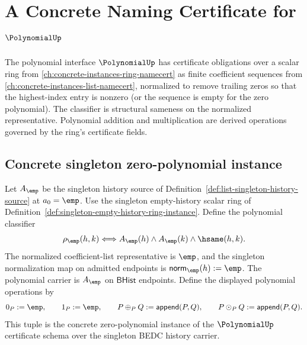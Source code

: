 \chapter{A Concrete Naming Certificate for \(\PolynomialUp\)}
\label{ch:concrete-instances-polynomial-namecert}

The polynomial interface \(\PolynomialUp\) has certificate obligations over a scalar ring from \autoref{ch:concrete-instances-ring-namecert} as finite coefficient sequences from \autoref{ch:concrete-instances-list-namecert}, normalized to remove trailing zeros so that the highest-index entry is nonzero (or the sequence is empty for the zero polynomial). The classifier is structural sameness on the normalized representative. Polynomial addition and multiplication are derived operations governed by the ring's certificate fields.

\section{Concrete singleton zero-polynomial instance}
\label{sec:polynomial-concrete-singleton-zero-instance}

\begin{definition}
\label{def:singleton-zero-polynomial-instance}
Let $A_{\emp}$ be the singleton history source of
Definition~\ref{def:list-singleton-history-source} at $a_0=\emp$. Use the
singleton empty-history scalar ring of
Definition~\ref{def:singleton-empty-history-ring-instance}. Define the
polynomial classifier
$$
\rho_{\emp}(h,k)\Longleftrightarrow
A_{\emp}(h)\land A_{\emp}(k)\land\hsame(h,k).
$$
The normalized coefficient-list representative is $\emp$, and the singleton
normalization map on admitted endpoints is $\mathsf{norm}_{\emp}(h):=\emp$.
The polynomial carrier is $A_{\emp}$ on $\mathsf{BHist}$ endpoints. Define the
displayed polynomial operations by
$$
0_P:=\emp,\qquad 1_P:=\emp,\qquad
P\oplus_P Q:=\mathsf{append}(P,Q),\qquad
P\odot_P Q:=\mathsf{append}(P,Q).
$$
This tuple is the concrete zero-polynomial instance of the
$\PolynomialUp$ certificate schema over the singleton BEDC history carrier.
\end{definition}

